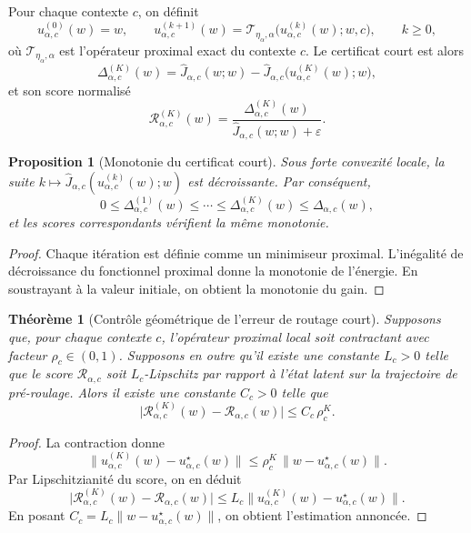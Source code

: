 \documentclass[11pt,a4paper]{article}
\newtheorem{proposition}{Proposition}[section]
\newtheorem{theorem}{Théorème}[section]
\begin{document}
Pour chaque contexte \(c\), on définit
\[
u^{(0)}_{\alpha,c}(w)=w,
\qquad
u^{(k+1)}_{\alpha,c}(w)
=
\mathcal T_{\eta_\alpha,\alpha}\!\bigl(u^{(k)}_{\alpha,c}(w);w,c\bigr),
\qquad k\ge 0,
\]
où \(\mathcal T_{\eta_\alpha,\alpha}\) est l'opérateur proximal exact du contexte \(c\).
Le certificat court est alors
\[
\Delta^{(K)}_{\alpha,c}(w)
=
\widehat J_{\alpha,c}(w;w)
-
\widehat J_{\alpha,c}\bigl(u^{(K)}_{\alpha,c}(w);w\bigr),
\]
et son score normalisé
\[
\mathcal R^{(K)}_{\alpha,c}(w)
=
\frac{\Delta^{(K)}_{\alpha,c}(w)}{\widehat J_{\alpha,c}(w;w)+\varepsilon}.
\]

\begin{proposition}[Monotonie du certificat court]
Sous forte convexité locale, la suite \(k\mapsto \widehat J_{\alpha,c}(u^{(k)}_{\alpha,c}(w);w)\) est décroissante.
Par conséquent,
\[
0\le \Delta^{(1)}_{\alpha,c}(w)\le \cdots \le \Delta^{(K)}_{\alpha,c}(w)\le \Delta_{\alpha,c}(w),
\]
et les scores correspondants vérifient la même monotonie.
\end{proposition}

\begin{proof}
Chaque itération est définie comme un minimiseur proximal.
L'inégalité de décroissance du fonctionnel proximal donne la monotonie de l'énergie.
En soustrayant à la valeur initiale, on obtient la monotonie du gain.
\end{proof}

\begin{theorem}[Contrôle géométrique de l'erreur de routage court]
\label{thm:short-rollout}
Supposons que, pour chaque contexte \(c\), l'opérateur proximal local soit contractant avec facteur \(\rho_c\in(0,1)\).
Supposons en outre qu'il existe une constante \(L_c>0\) telle que le score \(\mathcal R_{\alpha,c}\) soit \(L_c\)-Lipschitz par rapport à l'état latent sur la trajectoire de pré-roulage.
Alors il existe une constante \(C_c>0\) telle que
\[
\bigl|\mathcal R^{(K)}_{\alpha,c}(w)-\mathcal R_{\alpha,c}(w)\bigr|
\le
C_c\,\rho_c^K.
\]
\end{theorem}

\begin{proof}
La contraction donne
\[
\|u^{(K)}_{\alpha,c}(w)-u^\star_{\alpha,c}(w)\|
\le
\rho_c^K\,\|w-u^\star_{\alpha,c}(w)\|.
\]
Par Lipschitzianité du score, on en déduit
\[
\bigl|\mathcal R^{(K)}_{\alpha,c}(w)-\mathcal R_{\alpha,c}(w)\bigr|
\le
L_c\|u^{(K)}_{\alpha,c}(w)-u^\star_{\alpha,c}(w)\|.
\]
En posant \(C_c=L_c\|w-u^\star_{\alpha,c}(w)\|\), on obtient l'estimation annoncée.
\end{proof}
\end{document}
